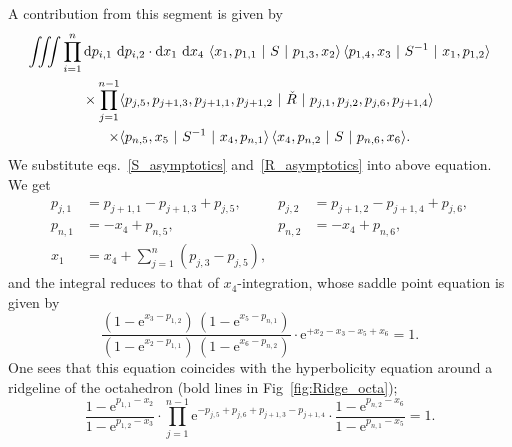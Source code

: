 \documentclass[12pt]{article}
\numberwithin{equation}{section}
\begin{document}
A contribution from this segment is given by
\begin{multline}
  \iiint \prod_{i=1}^n \mathrm{d} p_{i,1} \ \mathrm{d} p_{i,2} \cdot
  \mathrm{d} x_1 \   \mathrm{d} x_4 \
  \langle x_1 , p_{1,1} \  | \  S \  | \  p_{1,3} , x_2 \rangle \,
  \langle p_{1,4}, x_3 \ | \  S^{-1} \  | \  x_1, p_{1,2}  \rangle
  \\
  \times
  \prod_{j=1}^{n-1}
  \langle p_{j,5}, p_{j+1,3} , p_{j+1,1}, p_{j+1,2} \  | \
  \Check{R} \ | \
  p_{j,1} , p_{j,2} , p_{j,6} , p_{j+1,4} \rangle \\
  \times
  \langle p_{n,5} , x_5 \  | \  S^{-1} \  | \ x_4 , p_{n,1} \rangle \,
  \langle x_4 , p_{n,2} \ | \ S \  | \  p_{n,6} , x_6 \rangle .
\end{multline}
We substitute eqs.~\eqref{S_asymptotics} and~\eqref{R_asymptotics} into
above equation.
We get
\begin{align*}
  p_{j,1} &= p_{j+1,1} - p_{j+1,3} + p_{j,5},
  &
  p_{j,2} &= p_{j+1,2} - p_{j+1,4} + p_{j,6},
  \\[2mm]
%
  p_{n,1} & = - x_4 + p_{n,5} ,
  &
  p_{n,2} &= - x_4 + p_{n,6} ,
  \\
  x_1 &= x_4 + \sum_{j=1}^n ( p_{j,3} - p_{j,5} ) ,
\end{align*}
and the integral reduces to that of $x_4$-integration,
whose saddle point equation is given by
\begin{equation*}
  \frac{
    (1 - \mathrm{e}^{x_3 - p_{1,2}} ) \,
    ( 1 - \mathrm{e}^{x_5 - p_{n,1}} )
    }{
    (1 - \mathrm{e}^{x_2 - p_{1,1}} ) \,
    ( 1 - \mathrm{e}^{x_6 - p_{n,2}} )
    }
  \cdot
  \mathrm{e}^{
    + x_2 - x_3 - x_5 + x_6}
  =1 .
\end{equation*}
One sees that this equation coincides with the hyperbolicity equation
around a ridgeline of the octahedron
(bold lines in Fig~\ref{fig:Ridge_octa});
\begin{equation}
  \label{hyperbolic_ridge}
  \frac{1-\mathrm{e}^{p_{1,1} - x_2}}{1-\mathrm{e}^{p_{1,2} - x_3}}
  \cdot
  \prod_{j=1}^{n-1}
  \mathrm{e}^{-p_{j,5} + p_{j,6} + p_{j+1,3} - p_{j+1,4}}
  \cdot
  \frac{
    1-\mathrm{e}^{p_{n,2} - x_6}}{
    1 - \mathrm{e}^{p_{n,1} - x_5}
    } 
  = 1.
\end{equation}
\end{document}
